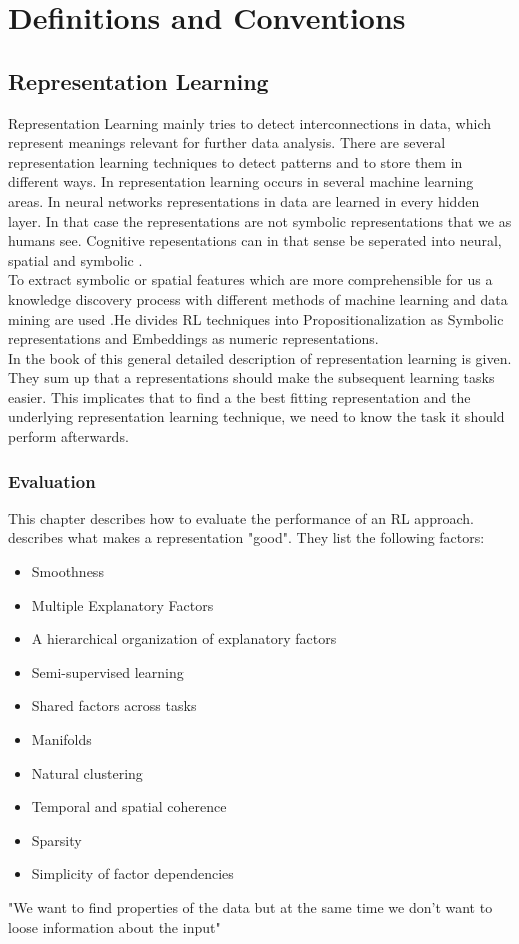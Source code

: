 \section{Definitions and Conventions}\label{theory}
\subsection{Representation Learning}
Representation Learning mainly tries to detect interconnections in data, which represent meanings relevant for further data analysis. There are several representation learning techniques to detect patterns and to store them in different ways. In  representation learning occurs in several machine learning areas. In neural networks representations in data are learned in every hidden layer. In that case the representations are not symbolic representations that we as humans see. Cognitive repesentations can in that sense be seperated into neural, spatial and symbolic \cite{gardenfors_conceptual_2000}.\\
To extract symbolic or spatial features which are more comprehensible for us a knowledge discovery process with different methods of machine learning and data mining are used \cite[p. 4]{lavrac_representation_2021}.He divides RL techniques into Propositionalization as Symbolic representations and Embeddings as numeric representations.\\
In the book of  this general detailed description of representation learning is given. They sum up that a representations should make the subsequent learning tasks easier. This implicates that to find a the best fitting representation and the underlying representation learning technique, we need to know the task it should perform afterwards.
\subsubsection{Evaluation}\label{theory:evaluation}
This chapter describes how to evaluate the performance of an RL approach.\\
\cite{bengio_representation_2013} describes what makes a representation "good". They list the following factors:
\begin{itemize}
  \item Smoothness
  \item Multiple Explanatory Factors
  \item A hierarchical organization of explanatory factors
  \item Semi-supervised learning
  \item Shared factors across tasks
  \item Manifolds
  \item Natural clustering
  \item Temporal and spatial coherence
  \item Sparsity
  \item Simplicity of factor dependencies
\end{itemize}
"We want to find properties of the data but at the same time we don't want to loose information about the input" \cite[S. 525]{goodfellow_deep_2016}\\


